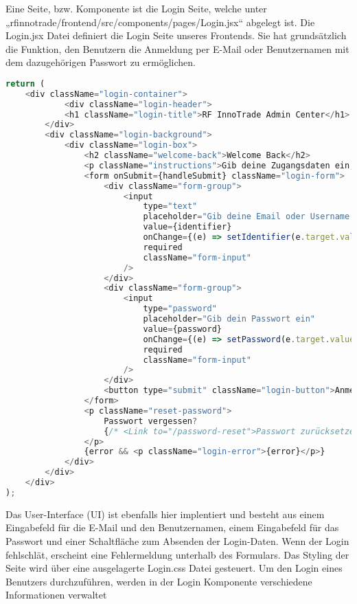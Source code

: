 Eine Seite, bzw. Komponente ist die Login Seite, welche unter „rfinnotrade/frontend/src/components/pages/Login.jsx“ abgelegt ist.
Die Login.jsx Datei definiert die Login Seite unseres Frontends. Sie hat grundsätzlich die Funktion, den Benutzern die Anmeldung per E-Mail oder Benutzernamen mit dem dazugehörigen Passwort zu ermöglichen.

\begin{lstlisting}[language=JavaScript, caption={Login.jsx Frontendaufbau}, label={lst:loginjsxUI}]
return (
    <div className="login-container">
            <div className="login-header">
            <h1 className="login-title">RF InnoTrade Admin Center</h1>
        </div>
        <div className="login-background">
            <div className="login-box">
                <h2 className="welcome-back">Welcome Back</h2>
                <p className="instructions">Gib deine Zugangsdaten ein, um Zugang zu deinem Account zu erhalten</p>
                <form onSubmit={handleSubmit} className="login-form">
                    <div className="form-group">
                        <input
                            type="text"
                            placeholder="Gib deine Email oder Username ein"
                            value={identifier}
                            onChange={(e) => setIdentifier(e.target.value)}
                            required
                            className="form-input"
                        />
                    </div>
                    <div className="form-group">
                        <input
                            type="password"
                            placeholder="Gib dein Passwort ein"
                            value={password}
                            onChange={(e) => setPassword(e.target.value)}
                            required
                            className="form-input"
                        />
                    </div>
                    <button type="submit" className="login-button">Anmelden</button>
                </form>
                <p className="reset-password">
                    Passwort vergessen? 
                    {/* <Link to="/password-reset">Passwort zurücksetzen </Link> */}
                </p>
                {error && <p className="login-error">{error}</p>}
            </div>
        </div>
    </div>
);
\end{lstlisting}

Das User-Interface (UI) ist ebenfalls hier implentiert und besteht aus einem Eingabefeld für die E-Mail und den Benutzernamen, einem Eingabefeld für das Passwort und einer Schaltfläche zum Absenden der Login-Daten. Wenn der Login fehlschlät, erscheint eine Fehlermeldung unterhalb des Formulars.
Das Styling der Seite wird über eine ausgelagerte Login.css Datei gesteuert.
Um den Login eines Benutzers durchzuführen, werden in der Login Komponente verschiedene Informationen verwaltet

